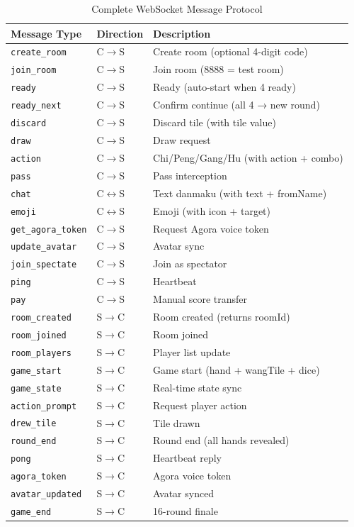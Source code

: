 \documentclass[11pt,a4paper]{article}
\begin{document}
\begin{table}[H]
\centering
\caption{Complete WebSocket Message Protocol}
\label{tab:proto}
\footnotesize
\begin{tabular}{@{}llp{5cm}@{}}
\toprule
\textbf{Message Type} & \textbf{Direction} & \textbf{Description} \\
\midrule
\texttt{create\_room}    & C$\to$S & Create room (optional 4-digit code) \\
\texttt{join\_room}      & C$\to$S & Join room (8888 = test room) \\
\texttt{ready}           & C$\to$S & Ready (auto-start when 4 ready) \\
\texttt{ready\_next}     & C$\to$S & Confirm continue (all 4 → new round) \\
\texttt{discard}         & C$\to$S & Discard tile (with tile value) \\
\texttt{draw}            & C$\to$S & Draw request \\
\texttt{action}          & C$\to$S & Chi/Peng/Gang/Hu (with action + combo) \\
\texttt{pass}            & C$\to$S & Pass interception \\
\texttt{chat}            & C$\leftrightarrow$S & Text danmaku (with text + fromName) \\
\texttt{emoji}           & C$\leftrightarrow$S & Emoji (with icon + target) \\
\texttt{get\_agora\_token}& C$\to$S & Request Agora voice token \\
\texttt{update\_avatar}  & C$\to$S & Avatar sync \\
\texttt{join\_spectate}  & C$\to$S & Join as spectator \\
\texttt{ping}            & C$\to$S & Heartbeat \\
\texttt{pay}             & C$\to$S & Manual score transfer \\
\midrule
\texttt{room\_created}   & S$\to$C & Room created (returns roomId) \\
\texttt{room\_joined}    & S$\to$C & Room joined \\
\texttt{room\_players}   & S$\to$C & Player list update \\
\texttt{game\_start}     & S$\to$C & Game start (hand + wangTile + dice) \\
\texttt{game\_state}     & S$\to$C & Real-time state sync \\
\texttt{action\_prompt}  & S$\to$C & Request player action \\
\texttt{drew\_tile}      & S$\to$C & Tile drawn \\
\texttt{round\_end}      & S$\to$C & Round end (all hands revealed) \\
\texttt{pong}            & S$\to$C & Heartbeat reply \\
\texttt{agora\_token}    & S$\to$C & Agora voice token \\
\texttt{avatar\_updated} & S$\to$C & Avatar synced \\
\texttt{game\_end}       & S$\to$C & 16-round finale \\
\bottomrule
\end{tabular}
\end{table}
\end{document}
